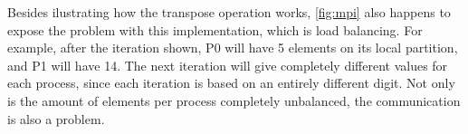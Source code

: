 Besides ilustrating how the transpose operation works, \autoref{fig:mpi} also happens to expose the problem with this implementation, which is load balancing. For example, after the iteration shown, P0 will have 5 elements on its local partition, and P1 will have 14. The next iteration will give completely different values for each process, since each iteration is based on an entirely different digit. Not only is the amount of elements per process completely unbalanced, the communication is also a problem.
